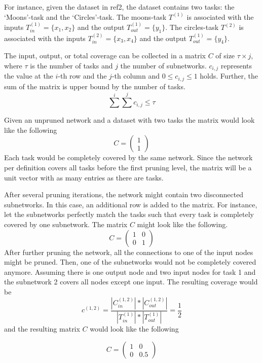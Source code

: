 For instance, given the dataset in ref2, the dataset contains two tasks: the `Moons'-task and the `Circles'-task. 
The moons-task $T^{(1)}$ is associated with the inputs $T^{(1)}_{in} = \{x_1,x_2\}$ and the output $T^{(1)}_{out} = \{y_1\}$.
The circles-task $T^{(2)}$ is associated with the inputs $T^{(2)}_{in} = \{x_3,x_4\}$ and the output $T^{(1)}_{out} = \{y_4\}$.

The input, output, or total coverage can be collected in a matrix $C$ of size $\tau \times j$, where $\tau$ is the number of tasks and $j$ the number of subnetworks. 
$c_{i,j}$ represents the value at the $i$-th row and the $j$-th column and $0 \leq c_{i,j} \leq 1$ holds.
Further, the sum of the matrix is upper bound by the number of tasks.
\[
\sum^{i} \sum^{j} c_{i,j} \leq \tau
\]


Given an unpruned network and a dataset with two tasks the matrix would look like the following 
\[
C = \begin{pmatrix}
    1 \\ 1
\end{pmatrix}
\]
Each task would be completely covered by the same network.
Since the network per definition covers all tasks before the first pruning level, the matrix will be a unit vector with as many entries as there are tasks.

After several pruning iterations, the network might contain two disconnected subnetworks.
In this case, an additional row is added to the matrix.
For instance, let the subnetworks perfectly match the tasks such that every task is completely covered by one subnetwork.
The matrix $C$ might look like the following.
\[
C = \begin{pmatrix}
    1 & 0 \\ 0 & 1
\end{pmatrix}
\]
After further pruning the network, all the connections to one of the input nodes might be pruned.
Then, one of the subnetworks would not be completely covered anymore.
Assuming there is one output node and two input nodes for task 1 and the subnetwork 2 covers all nodes except one input.
The resulting coverage would be 
\[
c^{(1,2)} =  \frac{
    | C^{(1,2)}_{in}| * | C^{(1,2)}_{out} |
    }{
    |T^{(1)}_{in}| * |T^{(1)}_{out}|
} = \frac{1}{2}
\]
and the resulting matrix $C$ would look like the following

\[
C = \begin{pmatrix}
    1 & 0 \\ 0 & 0.5
\end{pmatrix}
\]


